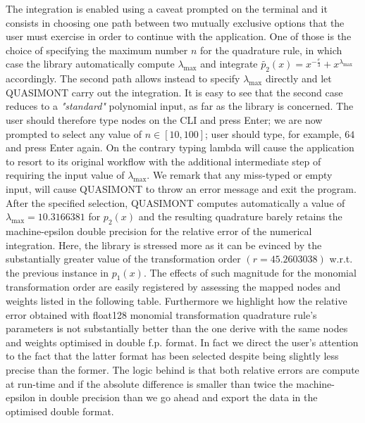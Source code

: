 \documentclass[a4paper, twosided]{book}
\begin{document}
\noindent
The integration is enabled using a caveat prompted on the terminal and it consists in choosing one path between two mutually exclusive options that the user must exercise in order to continue with the application. One of those is the choice of specifying the maximum number $n$ for the quadrature rule, in which case the library  automatically compute $\lambda_{\text{max}}$ and integrate $\tilde{p_2}(x) = x^{-\frac{e}{3}} + x^{\lambda_\text{max}}$ accordingly. The second path allows instead to specify $\lambda_{\text{max}}$ directly and let QUASIMONT carry out the integration. It is easy to see that the second case reduces to a \textsl{"standard"} polynomial input, as far as the library is concerned. The user should therefore type \colorbox{poliGrayBlue}{nodes} on the CLI and press Enter; we are now prompted to select any value of $n\in[10,100]$; user should type, for example, $64$ and press Enter again. On the contrary typing \colorbox{poliGrayBlue}{lambda} will cause the application to resort to its original workflow with the additional intermediate step of requiring the input value of $\lambda_{\text{max}}$. We remark that any miss-typed or empty input, will cause QUASIMONT to throw an error message and exit the program. After the specified selection, QUASIMONT computes automatically a value of $\lambda_{\text{max}} = 10.3166381$ for $p_2(x)$ and the resulting quadrature barely retains the machine-epsilon double precision for the relative error of the numerical integration. Here, the library is stressed more as it can be evinced by the substantially greater value of the transformation order $(r=45.2603038)$ w.r.t. the previous instance in $p_1(x)$. The effects of such magnitude for the monomial transformation order are easily registered by assessing the mapped nodes and weights listed in the following table. Furthermore we highlight how the relative error obtained with \colorbox{poliGrayBlue}{float128} monomial transformation quadrature rule's parameters is not substantially better than the one derive with the same nodes and weights optimised in double f.p. format. In fact we direct the user's attention to the fact that the latter format has been selected despite being slightly less precise than the former. The logic behind is that both relative errors are compute at run-time and if the absolute difference is smaller than twice the machine-epsilon in double precision than we go ahead and export the data in the optimised double format.
\end{document}
